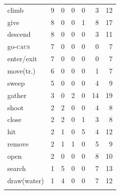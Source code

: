 \begin{table}
\begin{tabular}{lrrrrrr}
climb       &    9 &             0 &    0 &           0 &        3 &     12 \\
give        &    8 &             0 &    0 &           1 &        8 &     17 \\
descend     &    8 &             0 &    0 &           0 &        3 &     11 \\
go-\textsc{caus}     &    7 &             0 &    0 &           0 &        0 &      7 \\
enter/exit  &    7 &             0 &    0 &           0 &        0 &      7 \\
move(tr.)   &    6 &             0 &    0 &           0 &        1 &      7 \\
sweep       &    5 &             0 &    0 &           0 &        4 &      9 \\
gather      &    3 &             0 &    2 &           0 &       14 &     19 \\
shoot       &    2 &             2 &    0 &           0 &        4 &      8 \\
close       &    2 &             2 &    0 &           1 &        3 &      8 \\
hit         &    2 &             1 &    0 &           5 &        4 &     12 \\
remove      &    2 &             1 &    1 &           0 &        5 &      9 \\
open        &    2 &             0 &    0 &           0 &        8 &     10 \\
search      &    1 &             5 &    0 &           0 &        7 &     13 \\
draw(water) &    1 &             4 &    0 &           0 &        7 &     12 \\
		\lspbottomrule
	\end{tabular}
\end{table}

